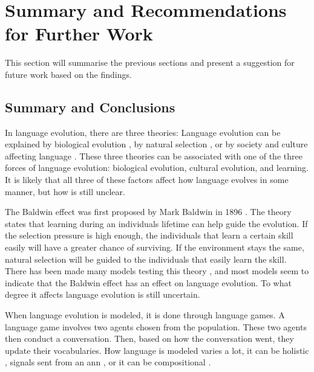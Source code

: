 \acresetall
\chapter{Summary and Recommendations for Further Work}
This section will summarise the previous sections and present a suggestion for future work based on the findings.

\section{Summary and Conclusions}
In language evolution, there are three theories: Language evolution can be explained by biological evolution \citet{chomsky1986knowledge}, by natural selection \citet{pinker1990natural}, or by society and culture affecting language \citet{quillinan2006social}. These three theories can be associated with one of the three forces of language evolution: biological evolution, cultural evolution, and learning. It is likely that all three of these factors affect how language evolves in some manner, but how is still unclear. 

The Baldwin effect was first proposed by Mark Baldwin in 1896 \citet{baldwin1896new}. The theory states that learning during an individuals lifetime can help guide the evolution. If the selection pressure is high enough, the individuals that learn a certain skill easily will have a greater chance of surviving. If the environment stays the same, natural selection will be guided to the individuals that easily learn the skill. There has been made many models testing this theory \citet{lipowska2011naming, zollman2010plasticity, chater2010language}, and most models seem to indicate that the Baldwin effect has an effect on language evolution. To what degree it affects language evolution is still uncertain.

When language evolution is modeled, it is done through language games. A language game involves two agents chosen from the population. These two agents then conduct a conversation. Then, based on how the conversation went, they update their vocabularies. How language is modeled varies a lot, it can be holistic \cite{lipowska2011naming}, signals sent from an \ac{ann} \cite{munroe2002learning}, or it can be compositional \cite{gong2004computational}. 

